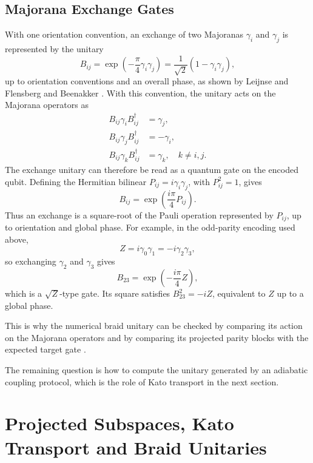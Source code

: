 \subsection{Majorana Exchange Gates\newline}
\label{sec:theory-majorana-exchange-gates}
With one orientation convention, an exchange of two Majoranas \(\gamma_i\) and \(\gamma_j\) is represented by the unitary
\[
B_{ij} = \exp\left(-\frac{\pi}{4}\gamma_i\gamma_j\right)
       = \frac{1}{\sqrt{2}}(1-\gamma_i\gamma_j),
\]
up to orientation conventions and an overall phase, as shown by Leijnse and Flensberg \cite{leijnseIntroductionTopologicalSuperconductivity2012} and Beenakker \cite{beenakkerSearchNonAbelianMajorana2020}. With this convention, the unitary acts on the Majorana operators as
\begin{align*}
B_{ij}\gamma_i B_{ij}^\dagger &= \gamma_j, \\
B_{ij}\gamma_j B_{ij}^\dagger &= -\gamma_i, \\
B_{ij}\gamma_k B_{ij}^\dagger &= \gamma_k, \quad k\neq i,j.
\end{align*}
The exchange unitary can therefore be read as a quantum gate on the encoded qubit. Defining the Hermitian bilinear \(P_{ij}=i\gamma_i\gamma_j\), with \(P_{ij}^2=1\), gives
\[
B_{ij}=\exp\left(\frac{i\pi}{4}P_{ij}\right).
\]
Thus an exchange is a square-root of the Pauli operation represented by \(P_{ij}\), up to orientation and global phase. For example, in the odd-parity encoding used above,
\[
Z=i\gamma_0\gamma_1=-i\gamma_2\gamma_3,
\]
so exchanging \(\gamma_2\) and \(\gamma_3\) gives
\[
B_{23}=\exp\left(-\frac{i\pi}{4}Z\right),
\]
which is a \(\sqrt{Z}\)-type gate. Its square satisfies \(B_{23}^2=-iZ\), equivalent to \(Z\) up to a global phase.

This is why the numerical braid unitary can be checked by comparing its action on the Majorana operators and by comparing its projected parity blocks with the expected target gate \cite{nayakNonAbelianAnyonsTopological2008,aliceaNewDirectionsPursuit2012}.

The remaining question is how to compute the unitary generated by an adiabatic coupling protocol, which is the role of Kato transport in the next section.
\newpage
\section{Projected Subspaces, Kato Transport and Braid Unitaries}

